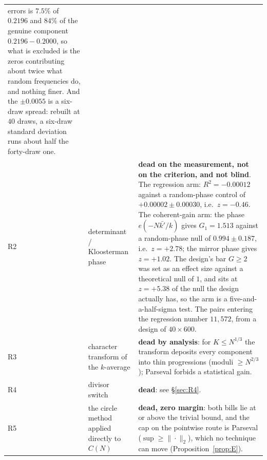 \documentclass[11pt,a4paper]{article}
\theoremstyle{plain}
\theoremstyle{definition}
\begin{document}
\begin{longtable}{p{}p{}p{}}
 errors is $7.5\%$ of $0.2196$ and $84\%$ of the genuine component
 $0.2196-0.2000$, so what is excluded is the zeros contributing about
 twice what random frequencies do, and nothing finer. And the
 $\pm0.0055$ is a six-draw spread: rebuilt at $40$ draws, a six-draw
 standard deviation runs about half the forty-draw one.\\
R2 & determinant / Kloosterman phase &
 \textbf{dead on the measurement, not on the criterion, and not
 blind}. The regression arm: $R^2 = -0.00012$ against a random-phase
 control of $+0.00002 \pm 0.00030$, i.e.\ $z = -0.46$. The
 coherent-gain arm: the phase $e(-N\bar{k'}/k)$ gives $G_1 = 1.513$
 against a random-phase null of $0.994 \pm 0.187$, i.e.\
 $z = +2.78$; the mirror phase gives $z = +1.02$. The design's bar
 $G \ge 2$ was set as an effect size against a theoretical null of
 $1$, and sits at $z = +5.38$ of the null the design actually has,
 so the arm is a five-and-a-half-sigma test. The pairs entering the
 regression number $11{,}572$, from a design of $40\times600$.\\
R3 & character transform of the $k$-average &
 \textbf{dead by analysis}: for $K \le N^{1/3}$ the transform deposits
 every component into thin progressions (moduli $\ge N^{2/3}$);
 Parseval forbids a statistical gain.\\
R4 & divisor switch &
 \textbf{dead}: see \S\ref{sec:R4}.\\
R5 & the circle method applied directly to $C(N)$ &
 \textbf{dead, zero margin}: both bills lie at or above the trivial
 bound, and the cap on the pointwise route is Parseval
 ($\sup\ge\|\cdot\|_2$), which no technique can move
 (Proposition~\ref{prop:E}).\\
\hline
\end{longtable}
\end{document}
